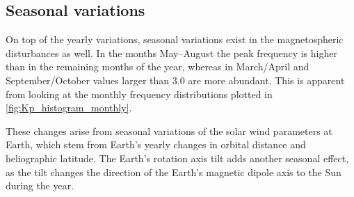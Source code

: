 \subsection{Seasonal variations}
On top of the yearly variations, seasonal variations exist in the magnetospheric disturbances as well. In the months May--August the \Kp{} peak frequency is higher than in the remaining months of the year, whereas in March/April and September/October \Kp{} values larger than \num{3.0} are more abundant. This is apparent from looking at the monthly \Kp{} frequency distributions plotted in \autoref{fig:Kp_histogram_monthly}.
\begin{figure}[htb]
	\begin{floatrow}
	\end{floatrow}
\end{figure}
These \Kp{} changes arise from seasonal variations of the solar wind parameters at Earth, which stem from Earth's yearly changes in orbital distance and heliographic latitude. The Earth's rotation axis tilt adds another seasonal effect, as the tilt changes the direction of the Earth's magnetic dipole axis to the Sun during the year.

